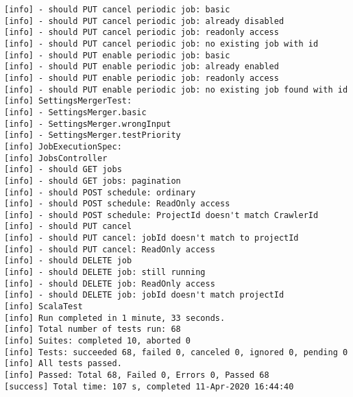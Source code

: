\begin{lstlisting}[frame=single, basicstyle=\footnotesize\ttfamily, label={lst:tests}, caption={Результаты тестирования в консоли},captionpos=b]
[info] - should PUT cancel periodic job: basic
[info] - should PUT cancel periodic job: already disabled
[info] - should PUT cancel periodic job: readonly access
[info] - should PUT cancel periodic job: no existing job with id
[info] - should PUT enable periodic job: basic
[info] - should PUT enable periodic job: already enabled
[info] - should PUT enable periodic job: readonly access
[info] - should PUT enable periodic job: no existing job found with id
[info] SettingsMergerTest:
[info] - SettingsMerger.basic
[info] - SettingsMerger.wrongInput
[info] - SettingsMerger.testPriority
[info] JobExecutionSpec:
[info] JobsController
[info] - should GET jobs
[info] - should GET jobs: pagination
[info] - should POST schedule: ordinary
[info] - should POST schedule: ReadOnly access
[info] - should POST schedule: ProjectId doesn't match CrawlerId
[info] - should PUT cancel
[info] - should PUT cancel: jobId doesn't match to projectId
[info] - should PUT cancel: ReadOnly access
[info] - should DELETE job
[info] - should DELETE job: still running
[info] - should DELETE job: ReadOnly access
[info] - should DELETE job: jobId doesn't match projectId
[info] ScalaTest
[info] Run completed in 1 minute, 33 seconds.
[info] Total number of tests run: 68
[info] Suites: completed 10, aborted 0
[info] Tests: succeeded 68, failed 0, canceled 0, ignored 0, pending 0
[info] All tests passed.
[info] Passed: Total 68, Failed 0, Errors 0, Passed 68
[success] Total time: 107 s, completed 11-Apr-2020 16:44:40


	\end{lstlisting}